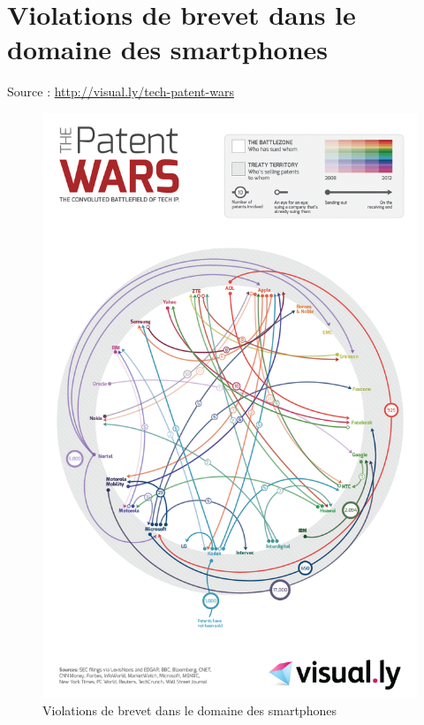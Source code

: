 \chapter{Violations de brevet dans le domaine des smartphones}
\label{annexe-smartphones}

Source : \url{http://visual.ly/tech-patent-wars}

\newpage

\begin{figure}[H]
\center
\includegraphics[scale=.442]{images/patent-wars.png}
\caption{Violations de brevet dans le domaine des smartphones}
\end{figure}
